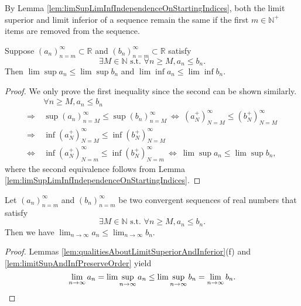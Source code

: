 \begin{rem}
  By Lemma \ref{lem:limSupLimInfIndependenceOnStartingIndices}, 
  both the limit superior and limit inferior of a sequence
  remain the same if the first $m\in\mathbb{N}^+$ items
  are removed from the sequence.
\end{rem}

\begin{lem}
  \label{lem:limitSupAndInfPreserveOrder}
  Suppose $(a_{n})_{n=m}^{\infty}\subset \mathbb{R}$
  and $(b_{n})_{n=m}^{\infty}\subset \mathbb{R}$ satisfy
  \begin{displaymath}
    \exists M\in \mathbb{N} \text{ s.t. }
    \forall n\ge M, a_{n}\le b_{n}.
  \end{displaymath}
  Then $\lim\sup a_{n}\le \lim\sup b_{n}$
  and $\lim\inf a_{n}\le \lim\inf b_{n}$.
\end{lem}
\begin{proof}
  We only prove the first inequality
  since the second can be shown similarly. 
  \begin{align*}
    &\ \forall n\ge M, a_{n}\le b_{n}
    \\
    \Rightarrow &\ 
    \sup(a_{n})_{n=M}^{\infty}\le \sup(b_{n})_{n=M}^{\infty}
    \ \Leftrightarrow\ 
    (a_{N}^{+})_{N=M}^{\infty} \le (b_{N}^{+})_{N=M}^{\infty}\\
    \Rightarrow &\  
    \inf(a_{N}^{+})_{N=M}^{\infty} \le \inf(b_{N}^{+})_{N=M}^{\infty}
    \\ \Leftrightarrow & \  
    \inf(a_{N}^{+})_{N=m}^{\infty} \le \inf(b_{N}^{+})_{N=m}^{\infty}
    \ \Leftrightarrow\ 
    \lim\sup a_{n} \le \lim\sup b_{n},
  \end{align*}
  where the second equivalence follows from
  Lemma \ref{lem:limSupLimInfIndependenceOnStartingIndices}. 
\end{proof}

\begin{lem}
  \label{lem:limitPreserveOrder}
   Let $(a_n)_{n=m}^{\infty}$ and $(b_n)_{n=m}^{\infty}$
  be two convergent sequences of real numbers
  that satisfy
  \begin{displaymath}
    \exists M\in \mathbb{N} \text{ s.t. }
    \forall n\ge M, a_n\le b_n.
  \end{displaymath}
  Then we have
  $\lim_{n\rightarrow \infty} a_n\le \lim_{n\rightarrow  \infty} b_n$.
\end{lem}
\begin{proof}
  Lemmas \ref{lem:qualitiesAboutLimitSuperiorAndInferior}(f)
  and \ref{lem:limitSupAndInfPreserveOrder} yield
  \begin{displaymath}
    \lim_{n\rightarrow\infty}a_{n}
    =\lim\sup_{n\rightarrow\infty}a_{n}\le
    \lim\sup_{n\rightarrow\infty}b_{n}
    =\lim_{{n\rightarrow\infty}}b_{n}.\qedhere
  \end{displaymath}
\end{proof}

